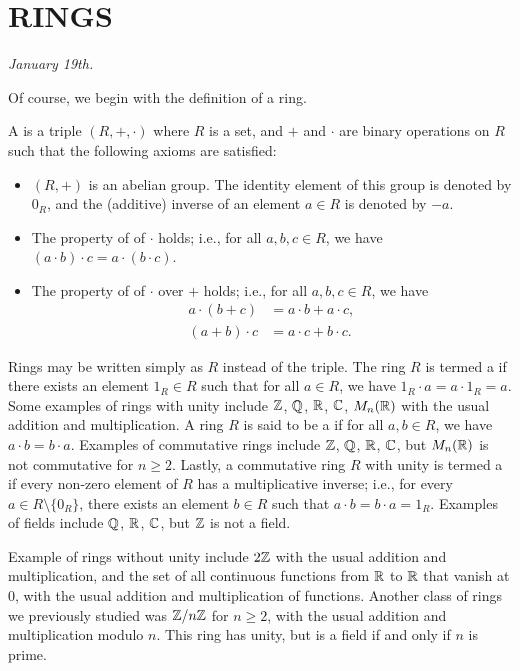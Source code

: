 \chapter{RINGS}

\textit{January 19th.}

Of course, we begin with the definition of a ring.

\begin{definition}
    A  is a triple $(R, +, \cdot)$ where $R$ is a set, and $+$ and $\cdot$ are binary operations on $R$ such that the following axioms are satisfied:
    \begin{itemize}
        \item $(R, +)$ is an abelian group. The identity element of this group is denoted by $0_{R}$, and the (additive) inverse of an element $a \in R$ is denoted by $-a$.
        \item The property of  of $\cdot$ holds; i.e., for all $a, b, c \in R$, we have $(a \cdot b) \cdot c = a \cdot (b \cdot c)$.
        \item The property of  of $\cdot$ over $+$ holds; i.e., for all $a, b, c \in R$, we have
        \begin{align}
            a \cdot (b + c) &= a \cdot b + a \cdot c, \\
            (a + b) \cdot c &= a \cdot c + b \cdot c.
        \end{align}
    \end{itemize}
\end{definition}

Rings may be written simply as $R$ instead of the triple. The ring $R$ is termed a  if there exists an element $1_{R} \in R$ such that for all $a \in R$, we have $1_{R} \cdot a = a \cdot 1_{R} = a$. Some examples of rings with unity include $\mathbb{Z}$, $\mathbb{Q}$, $\mathbb{R}$, $\mathbb{C}$, $M_{n}(\mathbb{R})$ with the usual addition and multiplication. A ring $R$ is said to be a  if for all $a, b \in R$, we have $a \cdot b = b \cdot a$. Examples of commutative rings include $\mathbb{Z}$, $\mathbb{Q}$, $\mathbb{R}$, $\mathbb{C}$, but $M_{n}(\mathbb{R})$ is not commutative for $n \geq 2$. Lastly, a commutative ring $R$ with unity is termed a  if every non-zero element of $R$ has a multiplicative inverse; i.e., for every $a \in R \setminus \{0_{R}\}$, there exists an element $b \in R$ such that $a \cdot b = b \cdot a = 1_{R}$. Examples of fields include $\mathbb{Q}$, $\mathbb{R}$, $\mathbb{C}$, but $\mathbb{Z}$ is not a field.

Example of rings without unity include $2\mathbb{Z}$ with the usual addition and multiplication, and the set of all continuous functions from $\mathbb{R}$ to $\mathbb{R}$ that vanish at $0$, with the usual addition and multiplication of functions. Another class of rings we previously studied was $\mathbb{Z}/n\mathbb{Z}$ for $n \geq 2$, with the usual addition and multiplication modulo $n$. This ring has unity, but is a field if and only if $n$ is prime.

